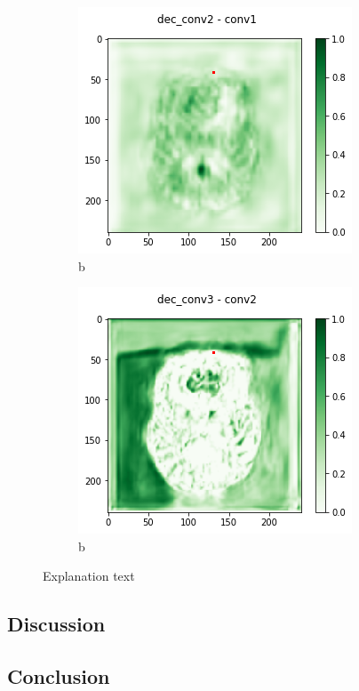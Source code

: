 \begin{figure}[H]
\begin{subfigure}{.33\textwidth}
        \includegraphics[width=\linewidth]{chapters/04_segmentation/images/grad_cam_24.png}
        \caption{b}
    \end{subfigure}
        \begin{subfigure}{.33\textwidth}
        \centering
        \includegraphics[width=\linewidth]{chapters/04_segmentation/images/grad_cam_29.png}
        \caption{b}
    \end{subfigure}
    \caption{Explanation text}
\end{figure}

\subsection{Discussion}


\subsection{Conclusion}
